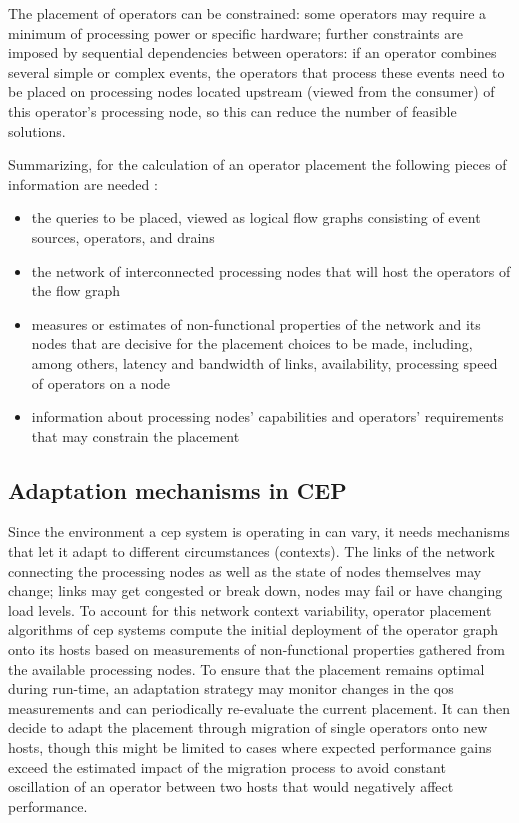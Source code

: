 The placement of operators can be constrained: some operators may require a minimum of processing power or specific hardware; further constraints are imposed by sequential dependencies between operators: if an operator combines several simple or complex events, the operators that process these events need to be placed on processing nodes located upstream (viewed from the consumer) of this operator's processing node, so this can reduce the number of feasible solutions. 

Summarizing, for the calculation of an operator placement the following pieces of information are needed \cite{Lakshmanan2008}:
\begin{itemize}
\item the queries to be placed, viewed as logical flow graphs consisting of event sources, operators, and drains
\item the network of interconnected processing nodes that will host the operators of the flow graph
\item measures or estimates of non-functional properties of the network and its nodes that are decisive for the placement choices  to be made, including, among others, latency and bandwidth of links, availability, processing speed of operators on a node 
\item information about processing nodes' capabilities and operators' requirements that may constrain the placement
\end{itemize}


\subsection{Adaptation mechanisms in CEP}
Since the environment a \gls{cep} system is operating in can vary, it needs mechanisms that let it adapt to different circumstances (contexts). The links of the network connecting the processing nodes as well as the state of nodes themselves may change; links may get congested or break down, nodes may fail or have changing load levels.
To account for this network context variability, operator placement algorithms of \gls{cep} systems compute the initial deployment of the operator graph onto its hosts based on measurements of non-functional properties gathered from the available processing nodes. 
To ensure that the placement remains optimal during run-time, an adaptation strategy may monitor changes in the \gls{qos} measurements and can periodically re-evaluate the current placement. It can then decide to adapt the placement through migration of single operators onto new hosts, though this might be limited to cases where expected performance gains exceed the estimated impact of the migration process to avoid constant oscillation of an operator between two hosts that would negatively affect performance.

